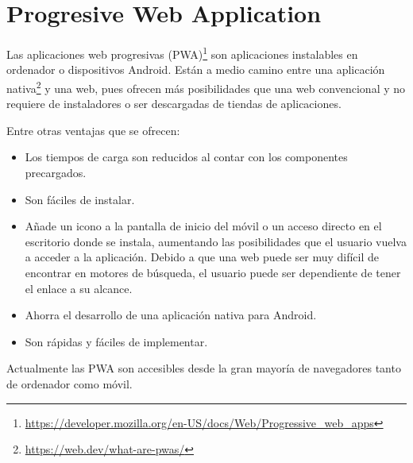 \section{Progresive Web Application}


Las aplicaciones web progresivas (PWA)\footnote{\url{https://developer.mozilla.org/en-US/docs/Web/Progressive_web_apps}} son aplicaciones instalables en ordenador o dispositivos Android. Están a medio camino entre una aplicación nativa\footnote{\url{https://web.dev/what-are-pwas/}}  y una web, pues ofrecen más posibilidades que una web convencional y no requiere de instaladores o ser descargadas de tiendas de aplicaciones.
    
Entre otras ventajas que se ofrecen:

\begin{itemize}
	\item Los tiempos de carga son reducidos al contar con los componentes precargados.
	
	
	\item Son fáciles de instalar.
	
	\item Añade un icono a la pantalla de inicio del móvil o un acceso directo en el escritorio donde se instala, aumentando las posibilidades que el usuario vuelva a acceder a la aplicación. Debido a que una web puede ser muy difícil de encontrar en motores de búsqueda, el usuario puede ser dependiente de tener el enlace a su alcance.
	
	\item Ahorra el desarrollo de una aplicación nativa para Android. 
	
	\item Son rápidas y fáciles de implementar.
	
\end{itemize}

Actualmente las PWA son accesibles desde la gran mayoría de navegadores tanto de ordenador como móvil.






